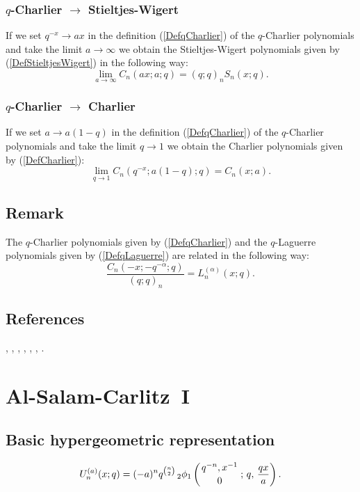 \documentclass[envcountchap,graybox]{svmono}
\newcommand{\qhyp}[5]{\mbox{}_{#1}{\phi}_{#2}
\left(\genfrac{}{}{0pt}{}{#3}{#4}\,;\,q,\,#5\right)}
\begin{document}
\subsubsection*{$q$-Charlier $\rightarrow$ Stieltjes-Wigert}
If we set $q^{-x}\rightarrow ax$ in the definition (\ref{DefqCharlier}) of the
$q$-Charlier polynomials and take the limit $a\rightarrow\infty$ we obtain
the Stieltjes-Wigert polynomials given by (\ref{DefStieltjesWigert}) in the
following way:
\begin{equation}
\lim_{a\rightarrow\infty}C_n(ax;a;q)=(q;q)_nS_n(x;q).
\end{equation}

\subsubsection*{$q$-Charlier $\rightarrow$ Charlier}
If we set $a\rightarrow a(1-q)$ in the definition (\ref{DefqCharlier})
of the $q$-Charlier polynomials and take the limit $q\rightarrow 1$ we obtain the
Charlier polynomials given by (\ref{DefCharlier}):
\begin{equation}
\lim_{q\rightarrow 1}C_n(q^{-x};a(1-q);q)=C_n(x;a).
\end{equation}

\subsection*{Remark}
The $q$-Charlier polynomials given by (\ref{DefqCharlier}) and the
$q$-Laguerre polynomials given by (\ref{DefqLaguerre}) are related in the
following way:
$$\frac{C_n(-x;-q^{-\alpha};q)}{(q;q)_n}=L_n^{(\alpha)}(x;q).$$

\subsection*{References}
\cite{AlvarezRonveaux}, \cite{AtakRahmanSuslov}, \cite{GasperRahman90},
\cite{Hahn}, \cite{Koelink96III}, \cite{Nikiforov+}, \cite{Zeng95}.


\section{Al-Salam-Carlitz~I}
\par\setcounter{equation}{0}

\subsection*{Basic hypergeometric representation}
\begin{equation}
\label{DefAlSalamCarlitzI}
U_n^{(a)}(x;q)=(-a)^nq^{\binom{n}{2}}\,\qhyp{2}{1}{q^{-n},x^{-1}}{0}{\frac{qx}{a}}.
\end{equation}
\end{document}
